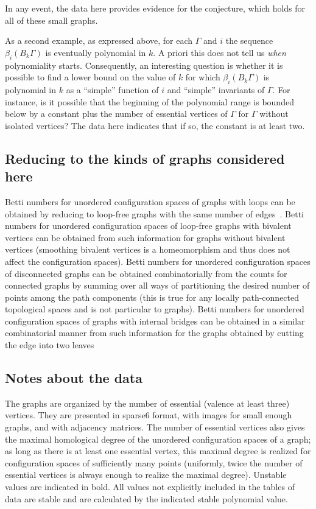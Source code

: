 \documentclass{amsart}
\theoremstyle{definition}
\begin{document}
In any event, the data here provides evidence for the conjecture, which holds for all of these small graphs.

As a second example, as expressed above, for each $\Gamma$ and $i$ the sequence $\beta_i(B_k\Gamma)$ is eventually polynomial in $k$. 
A priori this does not tell us \emph{when} polynomiality starts. 
Consequently, an interesting question is whether it is possible to find a lower bound on the value of $k$ for which $\beta_i(B_k\Gamma)$ is polynomial in $k$ as a ``simple'' function of $i$ and ``simple'' invariants of $\Gamma$. 
For instance, is it possible that the beginning of the polynomial range is bounded below by a constant plus the number of essential vertices of $\Gamma$ for $\Gamma$ without isolated vertices?
The data here indicates that if so, the constant is at least two.

\subsection*{Reducing to the kinds of graphs considered here}
Betti numbers for unordered configuration spaces of graphs with loops can be obtained by reducing to loop-free graphs with the same number of edges~\cite[Lemma 4.6]{AnDrummondColeKnudsen:ESHGBG}. 
Betti numbers for unordered configuration spaces of loop-free graphs with bivalent vertices can be obtained from such information for graphs without bivalent vertices (smoothing bivalent vertices is a homeomorphism and thus does not affect the configuration spaces). 
Betti numbers for unordered configuration spaces of disconnected graphs can be obtained combinatorially from the counts for connected graphs by summing over all ways of partitioning the desired number of points among the path components (this is true for any locally path-connected topological spaces and is not particular to graphs). 
Betti numbers for unordered configuration spaces of graphs with internal bridges can be obtained in a similar combinatorial manner from such information for the graphs obtained by cutting the edge into two leaves~\cite[Proposition 5.22]{AnDrummond-ColeKnudsen:SSGBG}

\subsection*{Notes about the data}
The graphs are organized by the number of essential (valence at least three) vertices. 
They are presented in sparse6 format, with images for small enough graphs, and with adjacency matrices.
The number of essential vertices also gives the maximal homological degree of the unordered configuration spaces of a graph; as long as there is at least one essential vertex, this maximal degree is realized for configuration spaces of sufficiently many points (uniformly, twice the number of essential vertices is always enough to realize the maximal degree).
Unstable values are indicated in bold.
All values not explicitly included in the tables of data are stable and are calculated by the indicated stable polynomial value.
\end{document}
